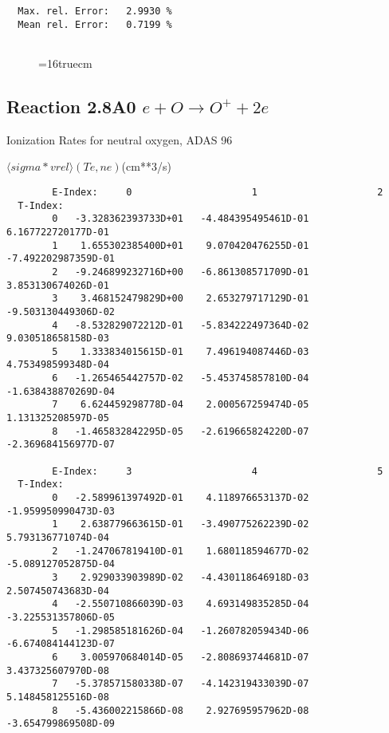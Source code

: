 \documentclass[12pt,dvipdfmx]{article}
\begin{document}
\begin{small}
\begin{verbatim}
  Max. rel. Error:   2.9930 %
  Mean rel. Error:   0.7199 %


\end{verbatim}\end{small}
\begin{figure} \label{2.7A0}
\epsfxsize=16truecm 
\end{figure}
\newpage


\subsection{
Reaction 2.8A0 $e + O \rightarrow O^+  + 2e $ }
  Ionization Rates for neutral  oxygen,   ADAS 96

$  \langle sigma*vrel \rangle(Te,ne) $(cm**3/s)
\begin{small}\begin{verbatim}
        E-Index:     0                     1                     2
  T-Index:
        0   -3.328362393733D+01   -4.484395495461D-01    6.167722720177D-01
        1    1.655302385400D+01    9.070420476255D-01   -7.492202987359D-01
        2   -9.246899232716D+00   -6.861308571709D-01    3.853130674026D-01
        3    3.468152479829D+00    2.653279717129D-01   -9.503130449306D-02
        4   -8.532829072212D-01   -5.834222497364D-02    9.030518658158D-03
        5    1.333834015615D-01    7.496194087446D-03    4.753498599348D-04
        6   -1.265465442757D-02   -5.453745857810D-04   -1.638438870269D-04
        7    6.624459298778D-04    2.000567259474D-05    1.131325208597D-05
        8   -1.465832842295D-05   -2.619665824220D-07   -2.369684156977D-07

        E-Index:     3                     4                     5
  T-Index:
        0   -2.589961397492D-01    4.118976653137D-02   -1.959950990473D-03
        1    2.638779663615D-01   -3.490775262239D-02    5.793136771074D-04
        2   -1.247067819410D-01    1.680118594677D-02   -5.089127052875D-04
        3    2.929033903989D-02   -4.430118646918D-03    2.507450743683D-04
        4   -2.550710866039D-03    4.693149835285D-04   -3.225531357806D-05
        5   -1.298585181626D-04   -1.260782059434D-06   -6.674084144123D-07
        6    3.005970684014D-05   -2.808693744681D-07    3.437325607970D-08
        7   -5.378571580338D-07   -4.142319433039D-07    5.148458125516D-08
        8   -5.436002215866D-08    2.927695957962D-08   -3.654799869508D-09


\end{verbatim}
\end{small}
\end{document}
